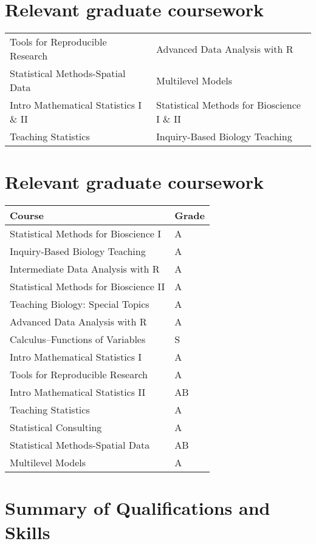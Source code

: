 \documentclass{article}
\begin{document}
\section*{Relevant graduate coursework}
\label{sec:org1dd07ac}

\begin{center}
\begin{tabular}{ll}
Tools for Reproducible Research & Advanced Data Analysis with R\\
Statistical Methods-Spatial Data & Multilevel Models\\
Intro Mathematical Statistics I \& II & Statistical Methods for Bioscience I \& II\\
Teaching Statistics & Inquiry-Based Biology Teaching\\
\end{tabular}
\end{center}


\section*{Relevant graduate coursework}
\label{sec:orgbb8fb2b}
\begin{center}
\begin{tabular}{ll}
Course & Grade\\
\hline
Statistical Methods for Bioscience I & A\\
Inquiry-Based Biology Teaching & A\\
Intermediate Data Analysis with R & A\\
Statistical Methods for Bioscience II & A\\
Teaching Biology: Special Topics & A\\
Advanced Data Analysis with R & A\\
Calculus--Functions of Variables & S\\
Intro Mathematical Statistics I & A\\
Tools for Reproducible Research & A\\
Intro Mathematical Statistics II & AB\\
Teaching Statistics & A\\
Statistical Consulting & A\\
Statistical Methods-Spatial Data & AB\\
Multilevel Models & A\\
\end{tabular}
\end{center}


\section*{Summary of Qualifications and Skills}
\label{sec:org646f4eb}
\end{document}
